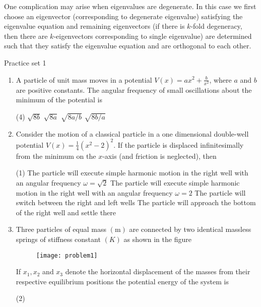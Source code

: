 One complication may arise when eigenvalues are degenerate. In this case we first choose an eigenvector (corresponding to degenerate eigenvalue) satisfying the eigenvalue equation and remaining eigenvectors (if there is $k$-fold degeneracy, then there are $k$-eigenvectors corresponding to single eigenvalue) are determined such that they satisfy the eigenvalue equation and are orthogonal to each other.
 \newpage
 \begin{abox}
 	Practice set 1
 	\end{abox}
 \begin{enumerate}
 		\item  A particle of unit mass moves in a potential $V(x)=a x^{2}+\frac{b}{x^{2}}$, where $a$ and $b$ are positive constants. The angular frequency of small oscillations about the minimum of the potential is
 		{}
 	\begin{tasks}(4)
 		\task[\textbf{A.}] $\sqrt{8 b}$
 		\task[\textbf{B.}]$\sqrt{8 a}$
 		\task[\textbf{C.}] $\sqrt{8 a / b}$
 		\task[\textbf{D.}]$\sqrt{8 b / a}$
 	\end{tasks}
 	\item Consider the motion of a classical particle in a one dimensional double-well potential $V(x)=\frac{1}{4}\left(x^{2}-2\right)^{2} .$ If the particle is displaced infinitesimally from the minimum on the $x$-axis (and friction is neglected), then
 	{}
 \begin{tasks}(1)
 	\task[\textbf{A.}] The particle will execute simple harmonic motion in the right well with an angular frequency $\omega=\sqrt{2}$
 	\task[\textbf{B.}]The particle will execute simple harmonic motion in the right well with an angular frequency $\omega=2$
 	\task[\textbf{C.}]The particle will switch between the right and left wells
 	\task[\textbf{D.}]The particle will approach the bottom of the right well and settle there
 \end{tasks}
	\item Three particles of equal mass $(\mathrm{m})$ are connected by two identical massless springs of stiffness constant $(K)$ as shown in the figure\\
	\begin{figure}[H]
		\centering
		\texttt{[image: problem1]}
	\end{figure}
	If $x_{1}, x_{2}$ and $x_{3}$ denote the horizontal displacement of the masses from their respective equilibrium positions the potential energy of the system is
	{}
\begin{tasks}(2)

\end{tasks}
\end{enumerate}
